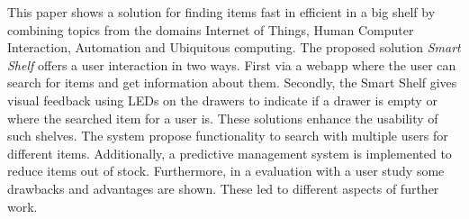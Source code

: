 This paper shows a solution for finding items fast in efficient in a big shelf by combining topics from the domains Internet of Things, Human Computer Interaction, Automation and Ubiquitous computing. 
The proposed solution \textit{Smart Shelf} offers a user interaction in two ways. 
First via a webapp where the user can search for items and get information about them. 
Secondly, the Smart Shelf gives visual feedback using LEDs on the drawers to indicate if a drawer is empty or where the searched item for a user is. 
These solutions enhance the usability of such shelves. 
The system propose functionality to search with multiple users for different items. 
Additionally, a predictive management system is implemented to reduce items out of stock. 
Furthermore, in a evaluation with a user study some drawbacks and advantages are shown. 
These led to different aspects of further work. 